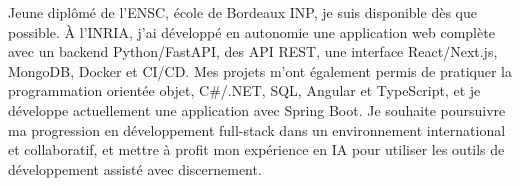 
\begin{cvparagraph}
Jeune diplômé de l’ENSC, école de Bordeaux INP, je suis disponible dès que possible. À l’INRIA, j’ai développé en autonomie une application web complète avec un backend Python/FastAPI, des API REST, une interface React/Next.js, MongoDB, Docker et CI/CD. Mes projets m’ont également permis de pratiquer la programmation orientée objet, C\#/.NET, SQL, Angular et TypeScript, et je développe actuellement une application avec Spring Boot. Je souhaite poursuivre ma progression en développement full-stack dans un environnement international et collaboratif, et mettre à profit mon expérience en IA pour utiliser les outils de développement assisté avec discernement.
\end{cvparagraph}
